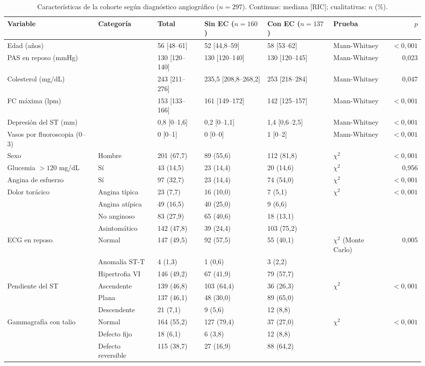 \documentclass[twocolumn,10pt]{article}
\begin{document}
\begin{table}[t]
\centering
\caption{Caracter\'isticas de la cohorte seg\'un diagn\'ostico angiogr\'afico ($n=297$). Continuas: mediana [RIC]; cualitativas: $n$ (\%).}
\label{tab:tabla1}
\small
\begin{tabular}{llllllr}
\toprule
\textbf{Variable} & \textbf{Categor\'ia} & \textbf{Total} & \textbf{Sin EC} ($n=160$) & \textbf{Con EC} ($n=137$) & \textbf{Prueba} & \textbf{$p$} \\
\midrule
Edad (a\~nos) & & 56 [48--61] & 52 [44,8--59] & 58 [53--62] & Mann-Whitney & $<0{,}001$ \\
PAS en reposo (mmHg) & & 130 [120--140] & 130 [120--140] & 130 [120--145] & Mann-Whitney & 0,023 \\
Colesterol (mg/dL) & & 243 [211--276] & 235,5 [208,8--268,2] & 253 [218--284] & Mann-Whitney & 0,047 \\
FC m\'axima (lpm) & & 153 [133--166] & 161 [149--172] & 142 [125--157] & Mann-Whitney & $<0{,}001$ \\
Depresi\'on del ST (mm) & & 0,8 [0--1,6] & 0,2 [0--1,1] & 1,4 [0,6--2,5] & Mann-Whitney & $<0{,}001$ \\
Vasos por fluoroscopia (0--3) & & 0 [0--1] & 0 [0--0] & 1 [0--2] & Mann-Whitney & $<0{,}001$ \\
Sexo & Hombre & 201 (67,7) & 89 (55,6) & 112 (81,8) & $\chi^2$ & $<0{,}001$ \\
Glucemia $>120$ mg/dL & S\'i & 43 (14,5) & 23 (14,4) & 20 (14,6) & $\chi^2$ & 0,956 \\
Angina de esfuerzo & S\'i & 97 (32,7) & 23 (14,4) & 74 (54,0) & $\chi^2$ & $<0{,}001$ \\
Dolor tor\'acico & Angina t\'ipica & 23 (7,7) & 16 (10,0) & 7 (5,1) & $\chi^2$ & $<0{,}001$ \\
 & Angina at\'ipica & 49 (16,5) & 40 (25,0) & 9 (6,6) & & \\
 & No anginoso & 83 (27,9) & 65 (40,6) & 18 (13,1) & & \\
 & Asintom\'atico & 142 (47,8) & 39 (24,4) & 103 (75,2) & & \\
ECG en reposo & Normal & 147 (49,5) & 92 (57,5) & 55 (40,1) & $\chi^2$ (Monte Carlo) & 0,005 \\
 & Anomal\'ia ST-T & 4 (1,3) & 1 (0,6) & 3 (2,2) & & \\
 & Hipertrofia VI & 146 (49,2) & 67 (41,9) & 79 (57,7) & & \\
Pendiente del ST & Ascendente & 139 (46,8) & 103 (64,4) & 36 (26,3) & $\chi^2$ & $<0{,}001$ \\
 & Plana & 137 (46,1) & 48 (30,0) & 89 (65,0) & & \\
 & Descendente & 21 (7,1) & 9 (5,6) & 12 (8,8) & & \\
Gammagraf\'ia con talio & Normal & 164 (55,2) & 127 (79,4) & 37 (27,0) & $\chi^2$ & $<0{,}001$ \\
 & Defecto fijo & 18 (6,1) & 6 (3,8) & 12 (8,8) & & \\
 & Defecto reversible & 115 (38,7) & 27 (16,9) & 88 (64,2) & & \\
\bottomrule
\end{tabular}
\end{table}
\end{document}
